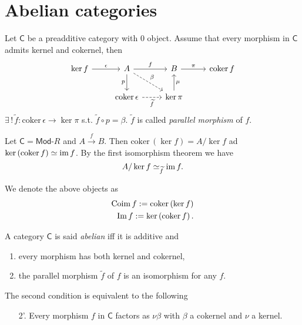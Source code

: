 \section{Abelian categories}

\begin{lem}
	Let $\mathsf{C}$ be a preadditive category with $0$ object.
	Assume that every morphism in $\mathsf{C}$ admits kernel and cokernel, then
	\begin{equation}
	\begin{tikzcd}
		\ker f \arrow[r, "\epsilon", rightarrow] & A \arrow[r, "f", rightarrow] \arrow[d, "p"', rightarrow] \arrow[rd, "\beta", dashrightarrow] &
		B \arrow[r, "\pi", rightarrow] & \mathrm{coker}\, f \\
					       & \mathrm{coker}\, \epsilon \arrow[r, "\widetilde{f}"', dashrightarrow] & \ker \pi \arrow[u, "\mu"', rightarrow] &
	\end{tikzcd}
	\end{equation} 
	$\exists\, !\, \widetilde{f}: \mathrm{coker}\, \epsilon \to \ker \pi$ s.t. $\widetilde{f} \circ p = \beta$.
	$\widetilde{f}$ is called {\em parallel morphism} of $f$.
\end{lem} 

\begin{ex}
	Let $\mathsf{C} = \mathsf{Mod}\text{-}R$ and $A \xrightarrow{f} B$.
	Then $\mathrm{coker}\, (\ker f) = A / \ker f$ ad $\ker \left( \mathrm{coker}\, f \right) \simeq \operatorname{im} f$.
	By the first isomorphism theorem we have
	\begin{equation}
	A/ \ker f \simeq_{\widetilde{f}} \operatorname{im} f
	.\end{equation} 
\end{ex} 

\begin{defn}
	We denote the above objects as
	\begin{align}
		\operatorname{Coim} f := \operatorname{coker} \left( \ker f \right)\\
		\operatorname{Im} f := \ker \left( \operatorname{coker} f \right)	
	.\end{align} 
\end{defn}

\begin{defn}
	A category $\mathsf{C}$ is said {\em abelian} iff it is additive and
	\begin{enumerate}
		\item every morphism has both kernel and cokernel,
		\item the parallel morphism $\widetilde{f}$ of $f$ is an isomorphism for any $f$.
	\end{enumerate}
	The second condition is equivalent to the following
	\begin{enumerate}
		\item[2'.] Every morphism $f$ in $\mathsf{C}$ factors as $\nu \beta$ with $\beta$ a cokernel and $\nu$ a kernel.
	\end{enumerate}
\end{defn}


